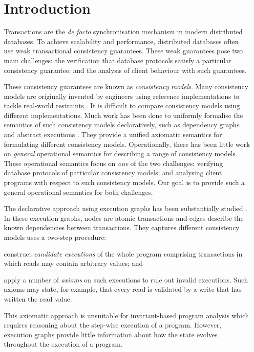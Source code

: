 \section{Introduction}
\label{sec:intro}

Transactions are the \emph{de facto} synchronisation mechanism in
modern distributed databases.  To achieve scalability and performance,
distributed databases often use weak transactional consistency
guarantees. These weak guarantees pose two main challenges: the
verification that database protocols satisfy a particular consistency
guarantee; and the analysis of client behaviour with such guarantees.

These consistency guarantees are known as \emph{consistency models}.
Many consistency models are originally invented by engineers
using reference implementations to tackle real-world restraints \cite{tango,CORFU,ramp,rola,cops,wren,redblue,PSI,NMSI,gdur,clocksi,distrsi,PSI-RA,si}.
It is difficult to compare consistency models using different implementations.
Much work has been done to uniformly formalise the semantics of such consistency models declaratively,
such as dependency graphs \cite{adya} and abstract executions \cite{ev_transactions}.
They provide a unified axiomatic semantics for formulating different consistency models.
Operationally, there has been little work on \emph{general} operational semantics
for describing a range of consistency models.
These operational semantics focus on \emph{one} of the two challenges:
verifying database protocols of particular consistency models;
and analysing client programs with respect to such consistency models.  
Our goal is to provide such a general operational semantics for both challenges.

The declarative approach using execution graphs has been substantially
studied \cite{adya,ev_transactions,framework-concur,laws}. 
In these execution graphs, nodes are atomic transactions and edges describe the
known dependencies between transactions.
They captures different consistency models uses a two-step procedure:
\begin{enumerate*}
\item construct {\em candidate executions} of the whole program comprising
transactions in which reads may contain arbitrary values; and 
\item apply a number of \emph{axioms} on such executions to rule out invalid executions. 
Such axioms may state, for example, that every read is
validated by a write that has written the read value. 
\end{enumerate*}
This axiomatic approach is unsuitable for invariant-based program analysis 
which requires reasoning about the step-wise execution of a program. 
However, execution graphs provide little information about how the 
state evolves throughout the execution of a program.

